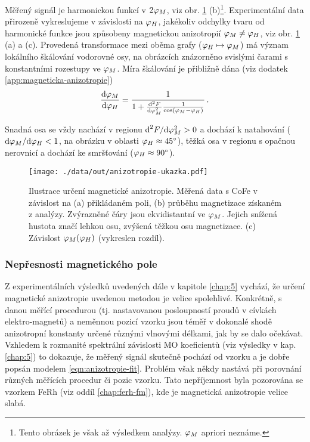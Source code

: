 Měřený signál je harmonickou funkcí v $2\varphi_M$, viz obr. \ref{fig:anizotropie-vizualni} (b)\footnote{Tento obrázek je však až výsledkem analýzy. $\varphi_M$ apriori neznáme.}.
Experimentální data přirozeně vykreslujeme v závislosti na $\varphi_H$, jakékoliv odchylky tvaru od harmonické funkce jsou způsobeny magnetickou anizotropií $\varphi_M\neq\varphi_H$, viz obr. \ref{fig:anizotropie-vizualni} (a) a (c).
Provedená transformace mezi oběma grafy ($\varphi_H \mapsto \varphi_M$) má význam lokálního škálování vodorovné osy, na obrázcích znázorněno svislými čarami s konstantními rozestupy ve $\varphi_M$.
Míra škálování je přibližně dána (viz dodatek \ref{app:magneticka-anizotropie})
\begin{equation}
    \frac{\textrm{d}\varphi_M}{\textrm{d}\varphi_H} = \frac{1}{1+\frac{\textrm{d}^2 F}{\textrm{d}\varphi_M^2}\frac{1}{\cos(\varphi_M-\varphi_H)}} \,.
\end{equation}

Snadná osa se vždy nachází v regionu $\textrm{d}^2F/\textrm{d}\varphi_M^2 > 0$ a dochází k natahování ($\textrm{d}\varphi_M/\textrm{d}\varphi_H < 1$, na obrázku v oblasti $\varphi_H\approx\SI{45}{\degree}$), těžká osa v regionu s opačnou nerovnicí a dochází ke smršťování ($\varphi_H\approx\SI{90}{\degree}$).

\begin{figure}[htbp]
    \centering
    \texttt{[image: ./data/out/anizotropie-ukazka.pdf]}
    \caption{Ilustrace určení magnetické anizotropie. Měřená data s CoFe v závislost na (a) přikládaném poli, (b) průběhu magnetizace získaném z analýzy.
    Zvýrazněné čáry jsou ekvidistantní ve $\varphi_M$. Jejich snížená hustota značí lehkou osu, zvýšená těžkou osu magnetizace. (c) Závislost $\varphi_M(\varphi_H)$ (vykreslen rozdíl).}
    \label{fig:anizotropie-vizualni}
\end{figure}


\subsubsection{Nepřesnosti magnetického pole}

Z experimentálních výsledků uvedených dále v kapitole \ref{chap:5} vychází, že určení magnetické anizotropie uvedenou metodou je velice spolehlivé.
Konkrétně, s danou měřící procedurou (tj. nastavovanou posloupností proudů v cívkách elektro-magnetů) a neměnnou pozicí vzorku jsou téměř v dokonalé shodě anizotropní konstanty určené různými vlnovými délkami, jak by se dalo očekávat.
Vzhledem k rozmanité spektrální závislosti MO koeficientů (viz výsledky v kap. \ref{chap:5}) to dokazuje, že měřený signál skutečně pochází od vzorku a je dobře popsán modelem \eqref{eqn:anizotropie-fit}.
Problém však někdy nastává při porovnání různých měřících procedur či pozic vzorku.
Tato nepříjemnost byla pozorována se vzorkem FeRh (viz oddíl \ref{chap:ferh-fm}), kde je magnetická anizotropie velice slabá.

